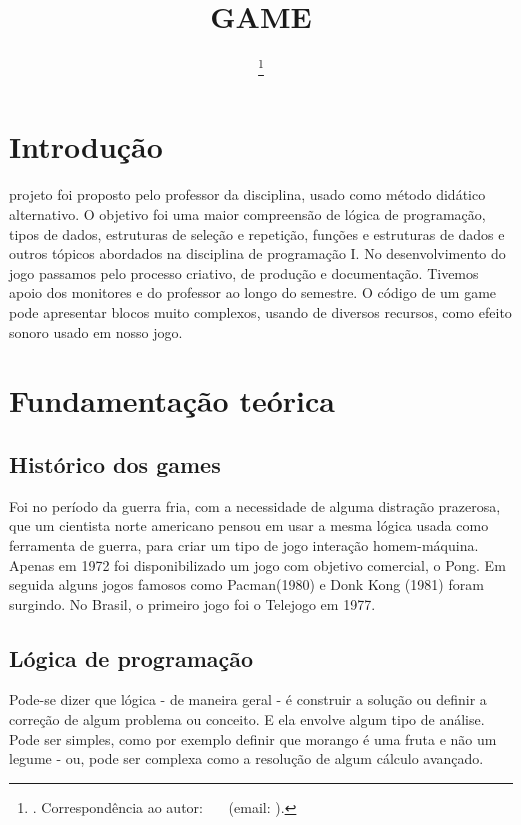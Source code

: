 \documentclass[journal]{IEEEtran}
\title                                                {GAME}
\author{\IEEEauthorblockN{\prenomePrincipal~\nomedomeioPrincipal~\sobrenomePrincipal\IEEEauthorrefmark{1}}

\IEEEauthorblockA{\IEEEauthorrefmark{1}Universidade Federal de Santa Catarina (UFSC)}%
\thanks{\Revista. Correspond\^encia ao autor: \prenomePrincipal~\nomedomeioPrincipal~\sobrenomePrincipal~(email: \emailautor).}}
\begin{document}
\maketitle
\IEEEdisplaynontitleabstractindextext
\IEEEpeerreviewmaketitle


\section{Introdução}

 projeto foi proposto pelo professor da disciplina, usado como método didático alternativo. O objetivo foi uma maior compreensão de lógica de programação, tipos de dados, estruturas de seleção e repetição, funções e estruturas de dados e outros tópicos abordados na disciplina de programação I. No desenvolvimento do jogo passamos pelo processo criativo, de produção e documentação. Tivemos apoio dos monitores e do professor ao longo do semestre.
O código de um game pode apresentar blocos muito complexos, usando de diversos recursos, como efeito sonoro usado em nosso jogo. 


\section{Fundamentação teórica}

\subsection{Histórico dos games}
Foi no período da guerra fria, com a necessidade de alguma distração prazerosa, que um cientista norte americano pensou em usar a mesma lógica usada como ferramenta de guerra, para criar um tipo de jogo interação homem-máquina. Apenas em 1972 foi disponibilizado um jogo com objetivo comercial, o Pong. Em seguida alguns jogos famosos como Pacman(1980) e Donk Kong (1981) foram surgindo. No Brasil, o primeiro jogo foi o Telejogo em 1977.


\subsection{Lógica de programação}
Pode-se dizer que lógica - de maneira geral - é construir a solução ou definir a correção de algum problema ou conceito. E ela envolve algum tipo de análise. Pode ser simples, como por exemplo definir que morango é uma fruta e não um legume - ou, pode ser complexa como a resolução de algum cálculo avançado.
\end{document}
